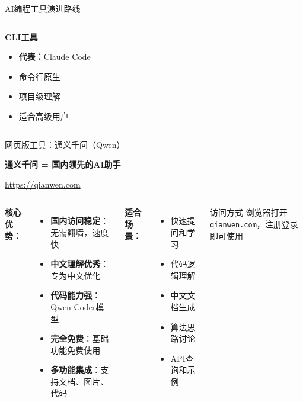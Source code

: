 \begin{frame}{AI编程工具演进路线}
\begin{columns}
		\begin{block}{\textbf{CLI工具}}
			\begin{itemize}
				\item \textbf{代表：}Claude Code
				\item 命令行原生
				\item 项目级理解
				\item 适合高级用户
			\end{itemize}
		\end{block}
	\end{columns}
\end{frame}


\begin{frame}{网页版工具：通义千问（Qwen）}
	\begin{center}
		\Huge \textbf{通义千问 = 国内领先的AI助手}

		\vspace{0.5cm}

		\normalsize
		\textcolor{blue}{\url{https://qianwen.com}}
	\end{center}

	\vspace{0.3cm}

	\begin{columns}
		\textbf{核心优势：}
		\begin{itemize}
			\item \textbf{国内访问稳定}：无需翻墙，速度快
			\item \textbf{中文理解优秀}：专为中文优化
			\item \textbf{代码能力强}：Qwen-Coder模型
			\item \textbf{完全免费}：基础功能免费使用
			\item \textbf{多功能集成}：支持文档、图片、代码
		\end{itemize}

		\textbf{适合场景：}
		\begin{itemize}
			\item 快速提问和学习
			\item 代码逻辑理解
			\item 中文文档生成
			\item 算法思路讨论
			\item API查询和示例
		\end{itemize}

		\vspace{0.3cm}

		\begin{alertblock}{访问方式}
			浏览器打开 \texttt{qianwen.com}，注册登录即可使用
		\end{alertblock}
	\end{columns}
\end{frame}

